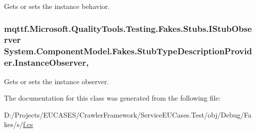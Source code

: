 Gets or sets the instance behavior.

\hypertarget{class_system_1_1_component_model_1_1_fakes_1_1_stub_type_description_provider_a17f028ec0fc064978f8c396a2819b925}{
\subsubsection[{Instance\-Observer}]{\setlength{\rightskip}{0pt plus 5cm}mqttf.\-Microsoft.\-Quality\-Tools.\-Testing.\-Fakes.\-Stubs.\-I\-Stub\-Observer System.\-Component\-Model.\-Fakes.\-Stub\-Type\-Description\-Provider.\-Instance\-Observer\hspace{0.3cm}{\ttfamily [get]}, {\ttfamily [set]}}}\label{class_system_1_1_component_model_1_1_fakes_1_1_stub_type_description_provider_a17f028ec0fc064978f8c396a2819b925}


Gets or sets the instance observer.



The documentation for this class was generated from the following file\-:\begin{DoxyCompactItemize}
\item 
D\-:/\-Projects/\-E\-U\-C\-A\-S\-E\-S/\-Crawler\-Framework/\-Service\-E\-U\-Cases.\-Test/obj/\-Debug/\-Fakes/s/\hyperlink{s_2f_8cs}{f.\-cs}\end{DoxyCompactItemize}
